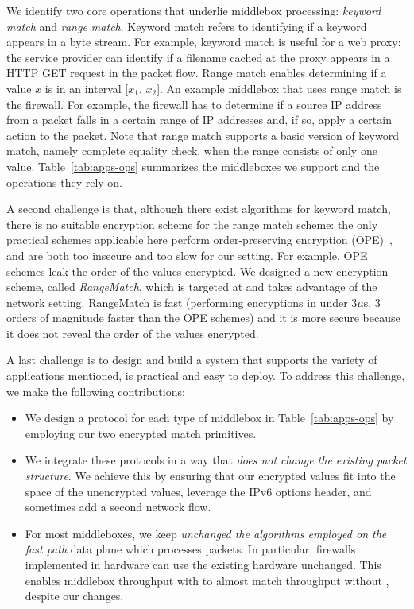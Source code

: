 We identify two core operations that underlie middlebox processing: {\em keyword match} and {\em range match}. Keyword match refers to  identifying if a keyword appears in a byte stream.   For example, keyword match is useful for a web proxy: the service provider can identify if a filename cached at the proxy appears in a HTTP GET request in the packet flow. %
Range match enables determining if a value $x$ is in an interval [$x_1$, $x_2$]. An example middlebox that uses range match is the firewall.   For example, the firewall has to determine if a source IP address from a packet falls in a certain range of IP addresses and, if so, apply a certain action to the packet.  Note that range match supports a basic version of keyword match, namely complete equality check, when the range consists of only one value.
%
Table~\ref{tab:apps-ops} summarizes the middleboxes we support and the operations they rely on. 


A second challenge is that, although there exist algorithms for keyword match, there is no suitable encryption scheme for the range match scheme:
 the only practical schemes applicable here perform order-preserving encryption (OPE)~\cite{boldyreva:ope,popa:mope}, and are both too insecure and too slow for our setting.  For example, OPE schemes leak the order of the values encrypted. We designed a new encryption scheme, called {\em RangeMatch}, which is targeted at and takes advantage of the network setting. RangeMatch  is fast (performing encryptions in under 3$\mu$s, 3 orders of magnitude faster than the OPE schemes) and it is more secure because it does not reveal the order of the values encrypted. 
 
A last challenge is to design and build a system that supports the variety of applications mentioned, is practical and easy to deploy. 
To address this challenge, we make the following contributions:
\begin{itemize}
\item We design a  protocol for each type of middlebox in Table~\ref{tab:apps-ops} by employing our two encrypted match  primitives.
\item  We integrate these protocols in a way that {\em does not change the existing packet structure}. We achieve this by ensuring that our encrypted values fit into the space of the unencrypted values, leverage the IPv6 options header, and sometimes add a second network flow.
\item  For most middleboxes, we keep {\em unchanged  the algorithms employed on the fast path} data plane which processes packets. In particular, firewalls implemented in hardware can use the existing hardware unchanged.  This enables middlebox throughput with \sys to almost match throughput without \sys, despite our changes.
\end{itemize}




